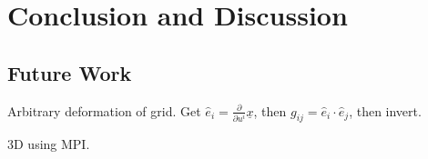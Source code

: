 
\chapter{Conclusion and Discussion}
\label{ch_conclusion}



\section{Future Work}

Arbitrary deformation of grid. Get $\hat{e}_i = \frac{\partial}{\partial u^i} \underline{x}$, then $g_{ij} = \hat{e}_i \cdot \hat{e}_j$, then invert. 

3D using MPI. 
